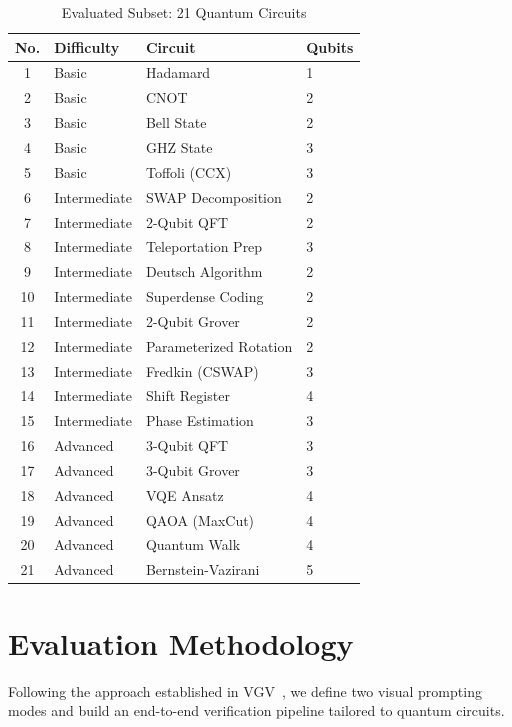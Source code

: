 \documentclass[conference]{IEEEtran}
\begin{document}
\begin{table}[t]
\centering
\caption{Evaluated Subset: 21 Quantum Circuits}
\label{tab:benchmark}
\small
\begin{tabular}{@{}clll@{}}
\toprule
No. & Difficulty & Circuit & Qubits \\
\midrule
1  & Basic & Hadamard          & 1 \\
2  & Basic & CNOT              & 2 \\
3  & Basic & Bell State        & 2 \\
4  & Basic & GHZ State         & 3 \\
5  & Basic & Toffoli (CCX)     & 3 \\
\midrule
6  & Intermediate & SWAP Decomposition    & 2 \\
7  & Intermediate & 2-Qubit QFT           & 2 \\
8  & Intermediate & Teleportation Prep    & 3 \\
9  & Intermediate & Deutsch Algorithm     & 2 \\
10 & Intermediate & Superdense Coding     & 2 \\
11 & Intermediate & 2-Qubit Grover        & 2 \\
12 & Intermediate & Parameterized Rotation & 2 \\
13 & Intermediate & Fredkin (CSWAP)       & 3 \\
14 & Intermediate & Shift Register        & 4 \\
15 & Intermediate & Phase Estimation      & 3 \\
\midrule
16 & Advanced & 3-Qubit QFT            & 3 \\
17 & Advanced & 3-Qubit Grover         & 3 \\
18 & Advanced & VQE Ansatz             & 4 \\
19 & Advanced & QAOA (MaxCut)          & 4 \\
20 & Advanced & Quantum Walk           & 4 \\
21 & Advanced & Bernstein-Vazirani     & 5 \\
\bottomrule
\end{tabular}
\end{table}

\section{Evaluation Methodology}

Following the approach established in VGV~\cite{wong2024vgv}, we define two visual prompting modes and build an end-to-end verification pipeline tailored to quantum circuits.
\end{document}
